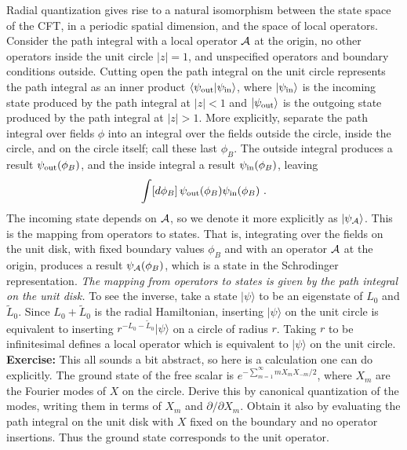 
Radial quantization gives rise to a natural
isomorphism between the state space of the CFT, in a periodic
spatial dimension, and the space of local operators.  Consider the
path integral with a local operator ${\cal A}$ at the origin,
no other operators inside the unit circle $|z| = 1$, and unspecified
operators and boundary conditions outside.  Cutting open the path
integral on the unit circle represents the path integral as an
inner product $\langle \psi_{\rm out} | \psi_{\rm in} \rangle$,
where $| \psi_{\rm in} \rangle$ is the incoming state produced by
the path integral at $|z| < 1$ and $| \psi_{\rm out} \rangle$
is the outgoing state produced by the path integral at $|z| > 1$.
More explicitly, separate the path integral over fields $\phi$ into
an integral over the fields outside the circle, inside the circle, and
on the circle itself; call these last $\phi_B$.  The outside integral
produces a result $\psi_{\rm out}(\phi_B)$, and the inside
integral a result $\psi_{\rm in}(\phi_B)$, leaving
\begin{equation}
\int [d\phi_B]\, \psi_{\rm out}(\phi_B) \psi_{\rm in}(\phi_B)\ .
\end{equation}
The incoming state depends on $\cal A$, so we denote it
more explicitly as $| \psi_{\cal A}\rangle$.  This is the 
mapping from operators to states.  That is, integrating over the
fields on the unit disk, with fixed boundary values $\phi_B$ and with
an operator $\cal A$ at the origin, produces a result $\psi_{\cal A}
(\phi_B)$, which is a state in the Schrodinger representation.
{\it The mapping from operators to states is given by the path
integral on the unit disk.}  To see the inverse, take a state $| \psi
\rangle$ to be an eigenstate of $L_0$ and $\tilde L_0$.  Since $L_0 +
\tilde L_0$ is the radial Hamiltonian, inserting $| \psi \rangle$ on
the unit circle is equivalent to inserting $r^{-L_0 - \tilde L_0}
| \psi \rangle$ on
a circle of radius $r$.  Taking $r$ to be infinitesimal defines a
local operator which is equivalent to $| \psi \rangle$ on the unit
circle.\\[3pt]
{\bf Exercise:}  This all sounds a bit abstract, so here is a
calculation one can do explicitly.  The ground state of the free scalar
is $e^{-\sum_{m=1}^\infty m X_m X_{-m} / 2}$, where $X_m$ are the
Fourier modes of $X$ on the circle.  Derive this by canonical
quantization of the modes, writing them in terms of $X_m$ and
$\partial/\partial X_m$.  Obtain
it also by evaluating the path integral on the unit disk with $X$ fixed
on the boundary and no operator insertions.  Thus the ground state
corresponds to the unit operator.

